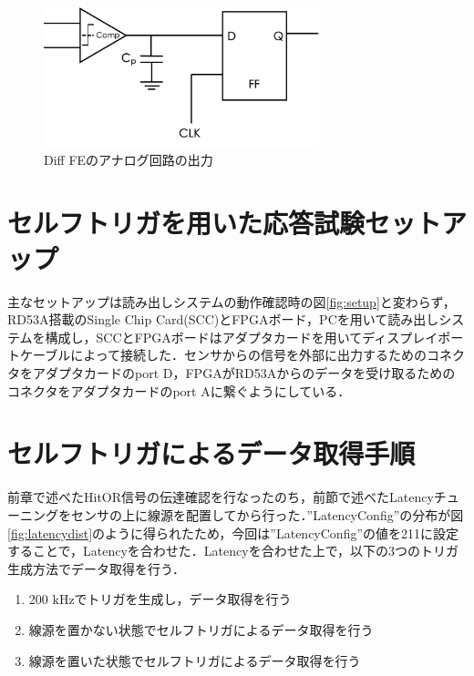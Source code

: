 \begin{figure}[h]
  \centering
  \includegraphics[width=8cm]{./figure/analogop.png}
  \caption{Diff FEのアナログ回路の出力}
  \label{fig:analogop}
\end{figure}


\section{セルフトリガを用いた応答試験セットアップ}
\label{sec:selfsetup}
主なセットアップは読み出しシステムの動作確認時の図\ref{fig:setup}と変わらず，RD53A搭載のSingle Chip Card(SCC)とFPGAボード，PCを用いて読み出しシステムを構成し，SCCとFPGAボードはアダプタカードを用いてディスプレイポートケーブルによって接続した．センサからの信号を外部に出力するためのコネクタをアダプタカードのport D，FPGAがRD53Aからのデータを受け取るためのコネクタをアダプタカードのport Aに繋ぐようにしている．

\section{セルフトリガによるデータ取得手順}
\label{sec:selfhow}
前章で述べたHitOR信号の伝達確認を行なったのち，前節で述べたLatencyチューニングをセンサの上に線源を配置してから行った．''LatencyConfig''の分布が図\ref{fig:latencydist}のように得られたため，今回は''LatencyConfig''の値を211に設定することで，Latencyを合わせた．Latencyを合わせた上で，以下の3つのトリガ生成方法でデータ取得を行う．
\begin{enumerate}
\item 200 $\mathrm{kHz}$でトリガを生成し，データ取得を行う
\item 線源を置かない状態でセルフトリガによるデータ取得を行う
\item 線源を置いた状態でセルフトリガによるデータ取得を行う
\end{enumerate}


